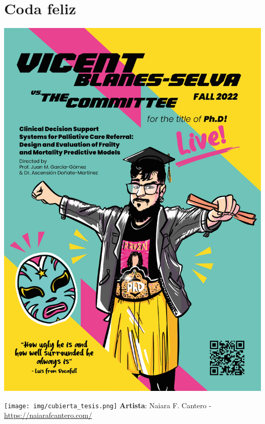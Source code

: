 \documentclass[bigger]{beamer}
\begin{document}
	\section{Coda feliz}
	\begin{frame}
		\centering
		\includegraphics[scale=0.2]{img/cartel.png}
	\end{frame}

	\begin{frame}
	\centering
	\texttt{[image: img/cubierta\_tesis.png]}
	\small
	\textbf{Artista}: Naiara F. Cantero - \url{https://naiarafcantero.com/}
\end{frame}
\end{document}
